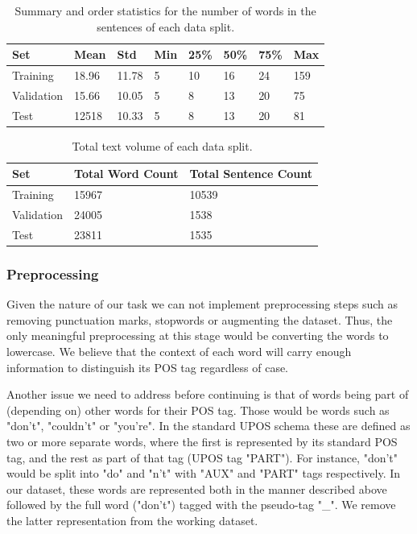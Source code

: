 \documentclass[10pt, a4paper]{article}
\begin{document}
	\begin{table}
		\begin{tabular}{|l|l|l|l|l|l|l|l|}
			\hline
			\cellcolor{blue!25}\textbf{Set} & \cellcolor{blue!25}\textbf{Mean} & \cellcolor{blue!25}\textbf{Std} &
			\cellcolor{blue!25}\textbf{Min} & \cellcolor{blue!25}\textbf{25\%} & \cellcolor{blue!25}\textbf{50\%} &
			\cellcolor{blue!25}\textbf{75\%} &
			\cellcolor{blue!25}\textbf{Max} \\
			\hline
			Training & 18.96 & 11.78 & 5  & 10 & 16 & 24 & 159 \\\hline
			Validation  & 15.66 & 10.05 & 5 & 8 & 13 & 20 & 75  \\\hline
			Test & 12518 & 10.33  & 5 & 8 & 13 & 20 & 81
			\\\hline
		\end{tabular}
		\centering
		\caption{Summary and order statistics for the number of words in the sentences of each data split.}
		\label{tab::ex-2-sent-stats}
	\end{table}
	
	\begin{table}
		\begin{tabular}{|l|l|l|}
			\hline
			\cellcolor{blue!25}\textbf{Set} & \cellcolor{blue!25}\textbf{Total Word Count} &
			\cellcolor{blue!25}\textbf{Total Sentence Count}\\
			\hline
			Training & 15967 & 10539 \\\hline
			Validation & 24005  & 1538 \\\hline
			Test & 23811 & 1535 \\\hline
		\end{tabular}
		\centering
		\caption{Total text volume of each data split.}
		\label{tab::ex-2-stats}
	\end{table}
	
	
	\subsubsection{Preprocessing}
	
	Given the nature of our task we can not implement preprocessing steps such as removing punctuation marks, stopwords or augmenting the dataset. Thus, the only meaningful preprocessing at this stage would be converting the words to lowercase. We believe that the context of each word will carry enough information to distinguish its POS tag regardless of case. 
	
	Another issue we need to address before continuing is that of words being part of (depending on) other words for their POS tag. Those would be words such as "don't", "couldn't" or "you're". In the standard UPOS schema these are defined as two or more separate words, where the first is represented by its standard POS tag, and the rest as part of that tag (UPOS tag "PART"). For instance, "don't" would be split into "do" and "n't" with "AUX" and "PART" tags respectively. In our dataset, these words are represented both in the manner described above followed by the full word ("don't") tagged with the pseudo-tag "\_". We remove the latter representation from the working dataset.
	
\end{document}
